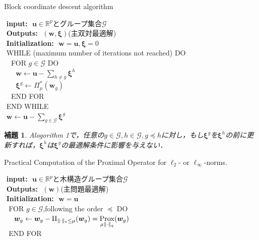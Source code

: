 \documentclass[a4paper,11pt]{jsarticle}
\newtheorem{lemma}[theorem]{補題}
\numberwithin{theorem}{section}  %
\numberwithin{equation}{section} %
\newcommand{\prox}{\mathop{\mathrm{\rm Prox}}\limits}
\begin{document}
\begin{algorithm}[H]
\caption{Block coordinate descent algorithm}
\label{A1}
\textbf{\,\,input:\,\,\,\,}$\bm{u}\in\mathbb{R}^p$とグループ集合$\mathcal{G}$\\
\textbf{\,\,Outputs:\,\,\,\,}$(\bm{w},\bm{\xi})$(主双対最適解)\\
\textbf{\,\,Initialization:\,\,\,\,}$\bm{w}=\bm{u}, \bm{\xi}=0$\\
\,\,WHILE (maximum number of iterations not reached) DO\\
\,\,\,\,\,\,FOR $g\in\mathcal{G}$ DO\\
\,\,\,\,\,\,\,\,\,\,$\bm{w} \leftarrow \bm{u}- \sum_{h\neq g} \bm{\xi}^h$\\
\,\,\,\,\,\,\,\,\,\,$\bm{\xi}^g \leftarrow \Pi_{\mu}^*(\bm{w}_g)$\\
\,\,\,\,\,\,END FOR\\
\,\,END WHILE\\
\,\,$\bm{w} \leftarrow \bm{u} - \sum_{g\in \mathcal{G}} \bm{\xi}^g$
\end{algorithm}

\begin{lemma}
Alogorithm 1で，任意の$g\in \mathcal{G},h\in \mathcal{G},g \preceq h$に対し，もし$\bm{\xi}^g$を$\bm{\xi}^h$の前に更新すれば，$\bm{\xi}^h$は$\bm{\xi}^g$の最適解条件に影響を与えない．
\end{lemma}

\begin{algorithm}[H]
\caption{Practical Computation of the Proximal Operator for $\ell_2$- or $\ell_\infty$-norms.}
\label{A1}
\textbf{\,\,input:\,\,\,\,}$\bm{u}\in\mathbb{R}^p$と木構造グループ集合$\mathcal{G}$\\
\textbf{\,\,Outputs:\,\,\,\,}$(\bm{w})$(主問題最適解)\\
\textbf{\,\,Initialization:\,\,\,\,}$\bm{w}=\bm{u}$\\
\,\,\,\,FOR $g\in\mathcal{G}$,following the order $\preceq$ DO\\
\,\,\,\,\,\,\,\,$\bm{w}_g \leftarrow \bm{w}_g - \Pi_{\|\cdot\|_* \le \mu}(\bm{w}_g) = \prox_{\mu \|\cdot\|_q} (\bm{w}_g)$\\
\,\,\,\,END FOR
\end{algorithm}
\end{document}

